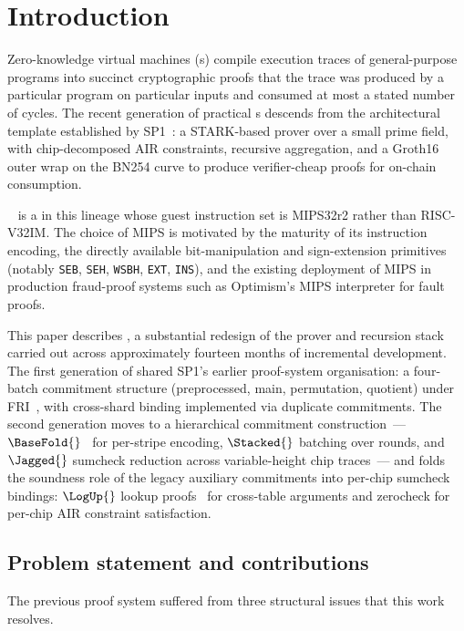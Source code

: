 \section{Introduction}
\label{sec:intro}

Zero-knowledge virtual machines (\zkVM s) compile execution traces of general-purpose programs into succinct cryptographic proofs that the trace was produced by a particular program on particular inputs and consumed at most a stated number of cycles. The recent generation of practical \zkVM s descends from the architectural template established by SP1~\citep{sp1}: a STARK-based prover over a small prime field, with chip-decomposed AIR constraints, recursive aggregation, and a Groth16 outer wrap on the BN254 curve to produce verifier-cheap proofs for on-chain consumption.

\Ziren{}~\citep{ziren} is a \zkVM{} in this lineage whose guest instruction set is MIPS32r2 rather than RISC-V32IM. The choice of MIPS is motivated by the maturity of its instruction encoding, the directly available bit-manipulation and sign-extension primitives (notably \texttt{SEB}, \texttt{SEH}, \texttt{WSBH}, \texttt{EXT}, \texttt{INS}), and the existing deployment of MIPS in production fraud-proof systems such as Optimism's MIPS interpreter for fault proofs.

This paper describes \Zirenver{}, a substantial redesign of the prover and recursion stack carried out across approximately fourteen months of incremental development. The first generation of \Ziren{} shared SP1's earlier proof-system organisation: a four-batch commitment structure (preprocessed, main, permutation, quotient) under FRI~\citep{ben2018fast}, with cross-shard binding implemented via duplicate commitments. The second generation moves to a hierarchical commitment construction~--- $\BaseFold{}$~\citep{basefold} for per-stripe encoding, $\Stacked{}$ batching over rounds, and $\Jagged{}$ sumcheck reduction across variable-height chip traces~--- and folds the soundness role of the legacy auxiliary commitments into per-chip sumcheck bindings: $\LogUp{}$ lookup proofs~\citep{logup-gkr} for cross-table arguments and zerocheck for per-chip AIR constraint satisfaction.

\subsection{Problem statement and contributions}

The previous \Ziren{} proof system suffered from three structural issues that this work resolves.

